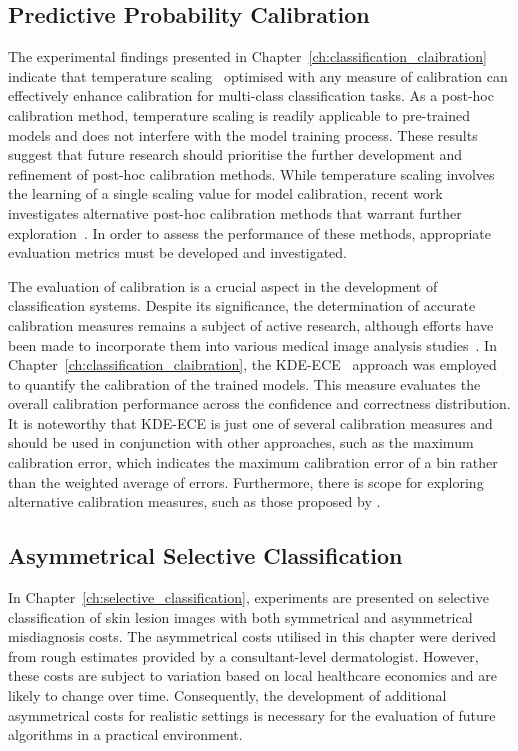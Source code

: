 \subsection{Predictive Probability Calibration}
The experimental findings presented in Chapter~\ref{ch:classification_claibration} indicate that temperature scaling~\citep{guo2017calibration} optimised with any measure of calibration can effectively enhance calibration for multi-class classification tasks. As a post-hoc calibration method, temperature scaling is readily applicable to pre-trained models and does not interfere with the model training process. These results suggest that future research should prioritise the further development and refinement of post-hoc calibration methods. While temperature scaling involves the learning of a single scaling value for model calibration, recent work investigates alternative post-hoc calibration methods that warrant further exploration~\citep{song2021classifier}. In order to assess the performance of these methods, appropriate evaluation metrics must be developed and investigated.

The evaluation of calibration is a crucial aspect in the development of classification systems. Despite its significance, the determination of accurate calibration measures remains a subject of active research, although efforts have been made to incorporate them into various medical image analysis studies~\citep{maier2022metrics}. In Chapter~\ref{ch:classification_claibration}, the KDE-ECE~\citep{zhang2020mix} approach was employed to quantify the calibration of the trained models. This measure evaluates the overall calibration performance across the confidence and correctness distribution. It is noteworthy that KDE-ECE is just one of several calibration measures and should be used in conjunction with other approaches, such as the maximum calibration error, which indicates the maximum calibration error of a bin rather than the weighted average of errors. Furthermore, there is scope for exploring alternative calibration measures, such as those proposed by \cite{nixon2019measuring}.

\subsection{Asymmetrical Selective Classification}
In Chapter~\ref{ch:selective_classification}, experiments are presented on selective classification of skin lesion images with both symmetrical and asymmetrical misdiagnosis costs. The asymmetrical costs utilised in this chapter were derived from rough estimates provided by a consultant-level dermatologist. However, these costs are subject to variation based on local healthcare economics and are likely to change over time. Consequently, the development of additional asymmetrical costs for realistic settings is necessary for the evaluation of future algorithms in a practical environment.

